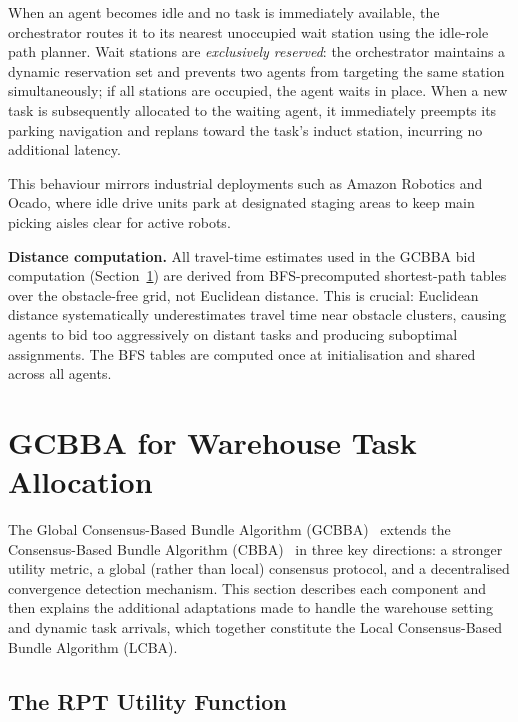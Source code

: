When an agent becomes idle and no task is immediately available, the
orchestrator routes it to its nearest unoccupied wait station using the
idle-role path planner.
Wait stations are \emph{exclusively reserved}: the orchestrator maintains a
dynamic reservation set and prevents two agents from targeting the same
station simultaneously; if all stations are occupied, the agent waits in
place.
When a new task is subsequently allocated to the waiting agent, it
immediately preempts its parking navigation and replans toward the task's
induct station, incurring no additional latency.

This behaviour mirrors industrial deployments such as Amazon Robotics and
Ocado, where idle drive units park at designated staging areas to keep main
picking aisles clear for active robots.

\textbf{Distance computation.}
All travel-time estimates used in the GCBBA bid computation
(Section~\ref{sec:method_gcbba}) are derived from BFS-precomputed shortest-path
tables over the obstacle-free grid, not Euclidean distance.
This is crucial: Euclidean distance systematically underestimates travel time
near obstacle clusters, causing agents to bid too aggressively on distant tasks
and producing suboptimal assignments.
The BFS tables are computed once at initialisation and shared across all agents.


\section{GCBBA for Warehouse Task Allocation}
\label{sec:method_gcbba}

The Global Consensus-Based Bundle Algorithm
(GCBBA)~\cite{kha2025enhancing} extends the Consensus-Based Bundle
Algorithm (CBBA)~\cite{choi2009consensus} in three key directions: a stronger
utility metric, a global (rather than local) consensus protocol, and a
decentralised convergence detection mechanism.
This section describes each component and then explains the additional
adaptations made to handle the warehouse setting and dynamic task arrivals,
which together constitute the Local Consensus-Based Bundle Algorithm (LCBA).


\subsection{The RPT Utility Function}
\label{subsec:method_rpt}

